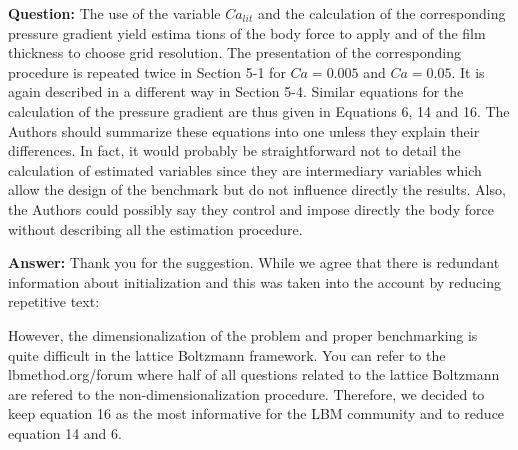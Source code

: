 \documentclass{article}
\begin{document}
\textbf{Question:}
The use of the variable $Ca_{lit}$ and the calculation of the corresponding pressure gradient yield
estima
tions of the body force to apply and of the ﬁlm thickness to choose grid resolution. The
presentation
of the corresponding procedure is repeated twice in Section 5-1 for $Ca=0.005$ and $Ca=0.05$. It is
again described in a diﬀerent way in Section 5-4. Similar equations for the calculation of the
pressure
gradient are thus given in Equations 6, 14 and 16. The Authors should summarize these equations
into one unless they explain their differences. In fact, it would probably be straightforward not to
detail the calculation of estimated variables since they are intermediary variables which allow the
design of the benchmark but do not inﬂuence directly the results. Also, the Authors could possibly
say they control and impose directly the body force without describing all the estimation procedure.

\textbf{Answer:} Thank you for the suggestion. While we agree that there is redundant information
about initialization and this was taken into the account by reducing repetitive text:
\begin{quotation}
\end{quotation}

 However, the
dimensionalization of the problem and proper benchmarking is quite difficult in the lattice
Boltzmann framework. You can refer to the lbmethod.org/forum where half of all questions related to
the lattice Boltzmann are refered to the non-dimensionalization procedure. Therefore, we decided to
keep equation 16 as the most informative for the LBM community and to reduce {\color{red} equation
14 and 6}.


\end{document}
